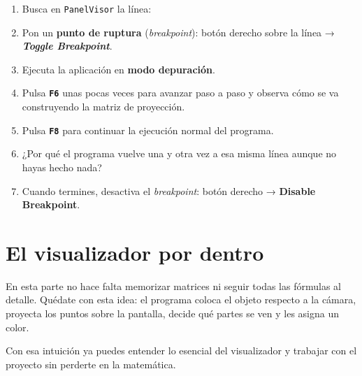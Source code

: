 \documentclass[
  spanish,
  11pt,
  a4paper,
  DIV=11,
  numbers=noendperiod]{scrartcl}
\begin{document}
\begin{tcolorbox}[enhanced jigsaw, colframe=quarto-callout-note-color-frame, arc=.35mm, bottomrule=.15mm, left=2mm, breakable, opacityback=0, coltitle=black, bottomtitle=1mm, toptitle=1mm, titlerule=0mm, toprule=.15mm, rightrule=.15mm, title={Usa el depurador}, colbacktitle=quarto-callout-note-color!10!white, opacitybacktitle=0.6, colback=white, leftrule=.75mm]

\begin{enumerate}
\def\labelenumi{\arabic{enumi}.}
\item
  Busca en \texttt{PanelVisor} la línea:

\item
  Pon un \textbf{punto de ruptura} (\emph{breakpoint}): botón derecho sobre la línea → \textbf{\emph{Toggle Breakpoint}}.
\item
  Ejecuta la aplicación en \textbf{modo depuración}.
\item
  Pulsa \textbf{\texttt{F6}} unas pocas veces para avanzar paso a paso y observa cómo se va construyendo la matriz de proyección.
\item
  Pulsa \textbf{\texttt{F8}} para continuar la ejecución normal del programa.
\item
  ¿Por qué el programa vuelve una y otra vez a esa misma línea aunque no hayas hecho nada?
\item
  Cuando termines, desactiva el \emph{breakpoint}: botón derecho → \textbf{Disable Breakpoint}.
\end{enumerate}

\end{tcolorbox}

\section{El visualizador por dentro}

\label{el-visualizador-por-dentro}

\begin{tcolorbox}[enhanced jigsaw, colframe=quarto-callout-note-color-frame, arc=.35mm, bottomrule=.15mm, left=2mm, breakable, opacityback=0, coltitle=black, bottomtitle=1mm, toptitle=1mm, titlerule=0mm, toprule=.15mm, rightrule=.15mm, title={Idea clave}, colbacktitle=quarto-callout-note-color!10!white, opacitybacktitle=0.6, colback=white, leftrule=.75mm]

En esta parte no hace falta memorizar matrices ni seguir todas las fórmulas al detalle. Quédate con esta idea: el programa coloca el objeto respecto a la cámara, proyecta los puntos sobre la pantalla, decide qué partes se ven y les asigna un color.

Con esa intuición ya puedes entender lo esencial del visualizador y trabajar con el proyecto sin perderte en la matemática.

\end{tcolorbox}
\end{document}
